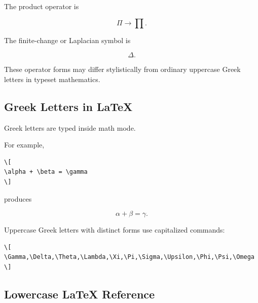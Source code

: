 The product operator is

\[
\boxed{
\Pi
\longrightarrow
\prod.
}
\]

The finite-change or Laplacian symbol is

\[
\boxed{
\Delta.
}
\]

These operator forms may differ stylistically from ordinary uppercase Greek
letters in typeset mathematics.

\subsection{Greek Letters in LaTeX}
\label{subsec:greek-letters-latex}

Greek letters are typed inside math mode.

For example,

\begin{verbatim}
\[
\alpha + \beta = \gamma
\]
\end{verbatim}

produces

\[
\boxed{
\alpha+\beta=\gamma.
}
\]

Uppercase Greek letters with distinct forms use capitalized commands:

\begin{verbatim}
\[
\Gamma,\Delta,\Theta,\Lambda,\Xi,\Pi,\Sigma,\Upsilon,\Phi,\Psi,\Omega
\]
\end{verbatim}

\subsection{Lowercase LaTeX Reference}
\label{subsec:lowercase-greek-latex-reference}


